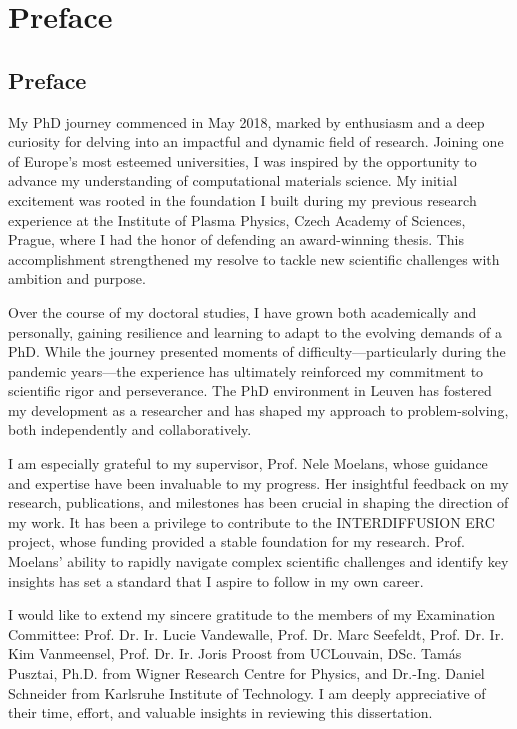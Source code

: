 \chapter*{Preface}                                  \label{ch:preface}
\section*{Preface}
My PhD journey commenced in May 2018, marked by enthusiasm and a deep curiosity for delving into an impactful and dynamic field of research. Joining one of Europe’s most esteemed universities, I was inspired by the opportunity to advance my understanding of computational materials science. My initial excitement was rooted in the foundation I built during my previous research experience at the Institute of Plasma Physics, Czech Academy of Sciences, Prague, where I had the honor of defending an award-winning thesis. This accomplishment strengthened my resolve to tackle new scientific challenges with ambition and purpose.

Over the course of my doctoral studies, I have grown both academically and personally, gaining resilience and learning to adapt to the evolving demands of a PhD. While the journey presented moments of difficulty—particularly during the pandemic years—the experience has ultimately reinforced my commitment to scientific rigor and perseverance. The PhD environment in Leuven has fostered my development as a researcher and has shaped my approach to problem-solving, both independently and collaboratively.

I am especially grateful to my supervisor, Prof. Nele Moelans, whose guidance and expertise have been invaluable to my progress. Her insightful feedback on my research, publications, and milestones has been crucial in shaping the direction of my work. It has been a privilege to contribute to the INTERDIFFUSION ERC project, whose funding provided a stable foundation for my research. Prof. Moelans’ ability to rapidly navigate complex scientific challenges and identify key insights has set a standard that I aspire to follow in my own career.

I would like to extend my sincere gratitude to the members of my Examination Committee: Prof. Dr. Ir. Lucie Vandewalle, Prof. Dr. Marc Seefeldt, Prof. Dr. Ir. Kim Vanmeensel, Prof. Dr. Ir. Joris Proost from UCLouvain, DSc. Tamás Pusztai, Ph.D. from Wigner Research Centre for Physics, and Dr.-Ing. Daniel Schneider from Karlsruhe Institute of Technology. I am deeply appreciative of their time, effort, and valuable insights in reviewing this dissertation.


